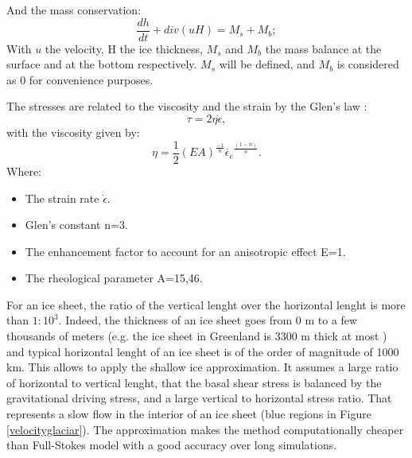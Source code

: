 \documentclass[a4paper,12pt]{article}
\begin{document}
And the mass conservation:
\begin{equation}
	\frac{dh}{dt}+ div(uH)=M_s + M_b;
\end{equation}
With $u$ the velocity, H the ice thickness, $M_s$ and $M_b$ the mass balance at the surface and at the bottom respectively. $M_s$ will be defined, and $M_b$ is considered as 0 for convenience purposes. 

The stresses are related to the viscosity and the strain by the Glen's law \cite[]{glen1958flow}:
\begin{equation}
	\tau = 2\eta\dot{\epsilon},
\end{equation}
with the viscosity given by:
\begin{equation}
	\eta = \frac{1}{2}(EA)^\frac{-1}{n} \dot{\epsilon_e}^\frac{(1-n)}{n}.
\end{equation}
Where:
\begin{itemize}
	\item The strain rate $\dot{\epsilon}$.
	\item Glen's constant n=3.
	\item The enhancement factor to account for an anisotropic effect E=1.
	\item The rheological parameter A=15,46.
\end{itemize}
For an ice sheet, the ratio of the vertical lenght over the horizontal lenght is more than $1:10^3$. Indeed, the thickness of an ice sheet goes from 0 m to a few thousands of meters (e.g. the ice sheet in Greenland is 3300 m thick at most \cite[]{bamber2001new}) and typical horizontal lenght of an ice sheet is of the order of magnitude of 1000 km. This allows to apply the shallow ice approximation. It assumes a large ratio of horizontal to vertical lenght, that the basal shear stress is balanced by  the gravitational driving stress, and a large vertical to horizontal stress ratio. That represents a slow flow in the interior of an ice sheet (blue regions in Figure \ref{velocityglaciar}). The approximation makes the method computationally cheaper than Full-Stokes model with a good accuracy over long simulations.
\end{document}

